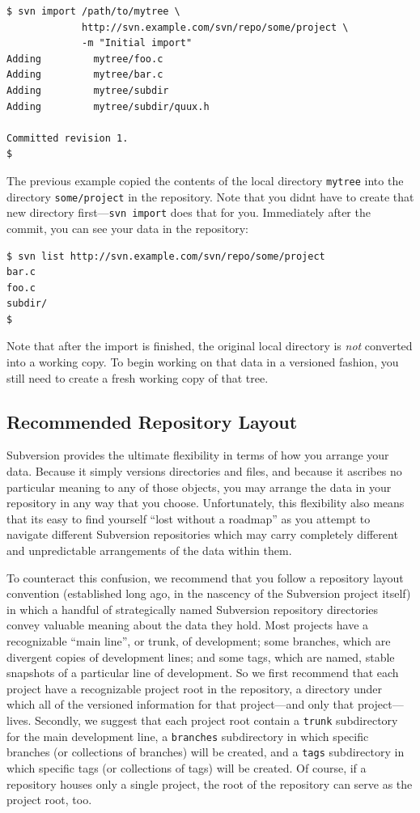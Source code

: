 \begin{verbatim}
$ svn import /path/to/mytree \
             http://svn.example.com/svn/repo/some/project \
             -m "Initial import"
Adding         mytree/foo.c
Adding         mytree/bar.c
Adding         mytree/subdir
Adding         mytree/subdir/quux.h

Committed revision 1.
$
\end{verbatim}

The previous example copied the contents of the local directory
\texttt{mytree} into the directory \texttt{some/project} in the
repository. Note that you didn\textquotesingle t have to create that new
directory first---\texttt{svn\ import} does that for you. Immediately
after the commit, you can see your data in the repository:

\begin{verbatim}
$ svn list http://svn.example.com/svn/repo/some/project
bar.c
foo.c
subdir/
$
\end{verbatim}

Note that after the import is finished, the original local directory is
\emph{not} converted into a working copy. To begin working on that data
in a versioned fashion, you still need to create a fresh working copy of
that tree.

\subsection{Recommended Repository
Layout}\label{svn.tour.importing.layout}

Subversion provides the ultimate flexibility in terms of how you arrange
your data. Because it simply versions directories and files, and because
it ascribes no particular meaning to any of those objects, you may
arrange the data in your repository in any way that you choose.
Unfortunately, this flexibility also means that it\textquotesingle s
easy to find yourself ``lost without a roadmap'' as you attempt to
navigate different Subversion repositories which may carry completely
different and unpredictable arrangements of the data within them.

To counteract this confusion, we recommend that you follow a repository
layout convention (established long ago, in the nascency of the
Subversion project itself) in which a handful of strategically named
Subversion repository directories convey valuable meaning about the data
they hold. Most projects have a recognizable ``main line'', or trunk, of
development; some branches, which are divergent copies of development
lines; and some tags, which are named, stable snapshots of a particular
line of development. So we first recommend that each project have a
recognizable project root in the repository, a directory under which all
of the versioned information for that project---and only that
project---lives. Secondly, we suggest that each project root contain a
\texttt{trunk} subdirectory for the main development line, a
\texttt{branches} subdirectory in which specific branches (or
collections of branches) will be created, and a \texttt{tags}
subdirectory in which specific tags (or collections of tags) will be
created. Of course, if a repository houses only a single project, the
root of the repository can serve as the project root, too.

